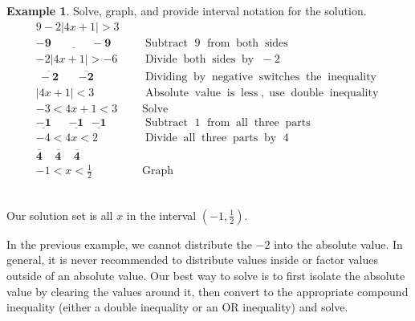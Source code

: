 \documentclass[12pt]{book}
\theoremstyle{definition}
\newtheorem{example}{Example}
\newcommand{\tmmathbf}[1]{\ensuremath{\boldsymbol{#1}}}
\newcommand{\tmop}[1]{\ensuremath{\operatorname{#1}}}
\begin{document}
\begin{example}\label{Lin105} Solve, graph, and provide interval notation for the solution.
  \begin{eqnarray*}
    9 - 2 |4x + 1| > 3~~ &  &\\
    \tmmathbf{\underline{- 9 ~~~~~~~~~~~~~~~~- 9}} &  & \tmop{Subtract~} 9 \tmop{~from} \tmop{both}
    \tmop{sides} \\
    - 2 |4x + 1| > - 6~ &  & \tmop{Divide} \tmop{both} \tmop{sides} \tmop{by~} -
    2\\
    \tmmathbf{\overline{~- 2~} ~~~~~~~ \overline{- 2}} &  & \tmop{Dividing} \tmop{by}
    \tmop{negative} \tmop{switches} \tmop{the} \tmop{inequality}\\
    |4x + 1| < 3~~&  & \tmop{Absolute} \tmop{value} \tmop{is} \tmop{less},
    \tmop{use} \tmop{double} \tmop{inequality}\\
    - 3 < 4 x + 1 < 3~~ &  & \tmop{Solve}\\
    \tmmathbf{\underline{- 1} ~~~~~~~\underline{- 1} ~~~\underline{- 1}} &  & \tmop{Subtract~} 1 \tmop{~from} \tmop{all}
    \tmop{three} \tmop{parts}\\
    - 4 < 4 x < 2~~&  & \tmop{Divide} \tmop{all} \tmop{three} \tmop{parts}
    \tmop{by~} 4\\
    \tmmathbf{\overline{4} ~~~~~ \overline{4} ~~~~~ \overline{4}}~~ &  & \\
    - 1 < x < \frac{1}{2}~ &  & \tmop{Graph}
  \end{eqnarray*}
\begin{center}
\\
Our solution set is all $x$ in the interval $(-1,\frac{1}{2})$.
\end{center}
\end{example}
In the previous example, we cannot distribute the $- 2$ into the absolute value. In general, it is never recommended to distribute values inside or factor values outside of an absolute value. Our best way to solve is to first isolate the absolute value by clearing the values around it, then convert to the appropriate compound inequality (either a double inequality or an OR inequality) and solve.\par
\end{document}
